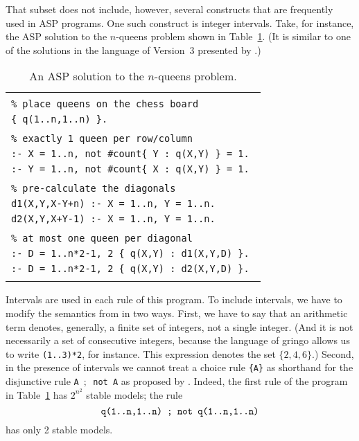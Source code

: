\documentclass{tlp}
\begin{document}
That subset does not include, however, several constructs that are frequently
used in ASP programs.  One such construct is integer intervals.
Take, for instance, the ASP solution
to the $n$-queens problem shown in Table~\ref{Kappa}. (It is similar to one of
the solutions in the language of Version~3 presented by  
\citeyear{geb11b}.)
\begin{table}\label{Kappa}
\begin{tabular}{l}
  \hline
  \\
  {\tt \% place queens on the chess board}\\ 
  {\tt \{ q(1..n,1..n) \}.}\\
  \\
  {\tt \% exactly 1 queen per row/column}\\ 
  {\tt :- X = 1..n, not \#count\{ Y : q(X,Y) \} = 1. }\\
  {\tt :- Y = 1..n, not \#count\{ X : q(X,Y) \} = 1. }\\
  \\
  {\tt \% pre-calculate the diagonals}\\ 
  {\tt d1(X,Y,X-Y+n) :- X = 1..n, Y = 1..n. }\\
  {\tt d2(X,Y,X+Y-1) :- X = 1..n, Y = 1..n. }\\
  \\
  {\tt \% at most one queen per diagonal}\\ 
  {\tt :- D = 1..n*2-1, 2 \{ q(X,Y) : d1(X,Y,D) \}. }\\
  {\tt :- D = 1..n*2-1, 2 \{ q(X,Y) : d2(X,Y,D) \}. }\\
  \\
  \hline
\end{tabular}
\caption{An ASP solution to the $n$-queens problem.}
\end{table}
Intervals are used in each rule of this program.  To include intervals, we
have to modify the semantics from  \citeyear{har14a} in 
two ways.  First,
we have to say that an arithmetic term denotes, generally, a finite set
of integers, not a single integer.   (And it is not necessarily a set
of consecutive integers, because the language of {\sc gringo} allows us to
write {\tt (1..3)*2}, for instance.  This expression denotes the set
$\{2,4,6\}$.)  Second, in the presence of intervals we cannot treat a choice
rule  {\tt \{A\}} as shorthand for the disjunctive rule
{\tt A $\!;\!$ not$\!$ A}
as proposed by  \citeyear{fer05b}.  Indeed, the first rule of 
the program in
Table~\ref{Kappa} has $2^{n^2}$ stable models; the rule
$$\hbox{\tt q(1..n,1..n) ; not  q(1..n,1..n)}$$
has only 2 stable models.
\end{document}
